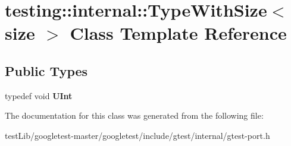 \hypertarget{classtesting_1_1internal_1_1TypeWithSize}{}\section{testing\+:\+:internal\+:\+:Type\+With\+Size$<$ size $>$ Class Template Reference}
\label{classtesting_1_1internal_1_1TypeWithSize}
\subsection*{Public Types}
\begin{DoxyCompactItemize}
\item 
\mbox{\label{classtesting_1_1internal_1_1TypeWithSize_a3898640d9f6c1e18110eef90f47a5d7b}} 
typedef void {\bfseries U\+Int}
\end{DoxyCompactItemize}


The documentation for this class was generated from the following file\+:\begin{DoxyCompactItemize}
\item 
test\+Lib/googletest-\/master/googletest/include/gtest/internal/gtest-\/port.\+h\end{DoxyCompactItemize}
